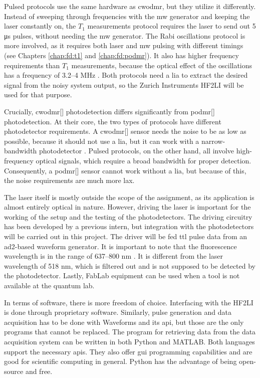 Pulsed protocols use the same hardware as \gls{cwodmr}, but they utilize it differently. Instead of sweeping through frequencies with the \gls{mw} generator and keeping the laser constantly on, the $T_1$ measurements protocol requires the laser to send out 5 \unit{\micro\second} pulses, without needing the \gls{mw} generator. The Rabi oscillations protocol is more involved, as it requires both laser and \gls{mw} pulsing with different timings (see Chapters \ref{chap:fd:t1} and \ref{chap:fd:podmr}). It also has higher frequency requirements than $T_1$ measurements, because the optical effect of the oscillations has a frequency of \numrange{3,2}{4} \unit{\mega\hertz} \cite{murzakhanov2025mechanism}. Both protocols need a \gls{lia} to extract the desired signal from the noisy system output, so the Zurich Instruments HF2LI will be used for that purpose.

Crucially, \gls{cwodmr}[] photodetection differs significantly from \gls{podmr}[] photodetection. At their core, the two types of protocols have different photodetector requirements. A \gls{cwodmr}[] sensor needs the noise to be as low as possible, because it should not use a \gls{lia}, but it can work with a narrow-bandwidth photodetector \cite{acharya2025compact}. Pulsed protocols, on the other hand, all involve high-frequency optical signals, which require a broad bandwidth for proper detection. Consequently, a \gls{podmr}[] sensor cannot work without a \gls{lia}, but because of this, the noise requirements are much more lax.

The laser itself is mostly outside the scope of the assignment, as its application is almost entirely optical in nature. However, driving the laser is important for the working of the setup and the testing of the photodetectors. The driving circuitry has been developed by a previous intern, but integration with the photodetectors will be carried out in this project. The driver will be fed \gls{ttl} pulse data from an \gls{ad2}-based waveform generator. It is important to note that the fluorescence wavelength is in the range of \numrange{637}{800} \unit{\nano\meter} \cite{hsiao2016fluorescent, enwiki:1301371272}. It is different from the laser wavelength of 518 \unit{\nano\metre}, which is filtered out and is not supposed to be detected by the photodetector. Lastly, FabLab equipment can be used when a tool is not available at the quantum lab. 
	
In terms of software, there is more freedom of choice. Interfacing with the HF2LI is done through proprietary software. Similarly, pulse generation and data acquisition has to be done with Waveforms and its \gls{api}, but those are the only programs that cannot be replaced. The program for retrieving data from the data acquisition system can be written in both Python and MATLAB. Both languages support the necessary \gls{api}s. They also offer \gls{gui} programming capabilities and are good for scientific computing in general. Python has the advantage of being open-source and free.

